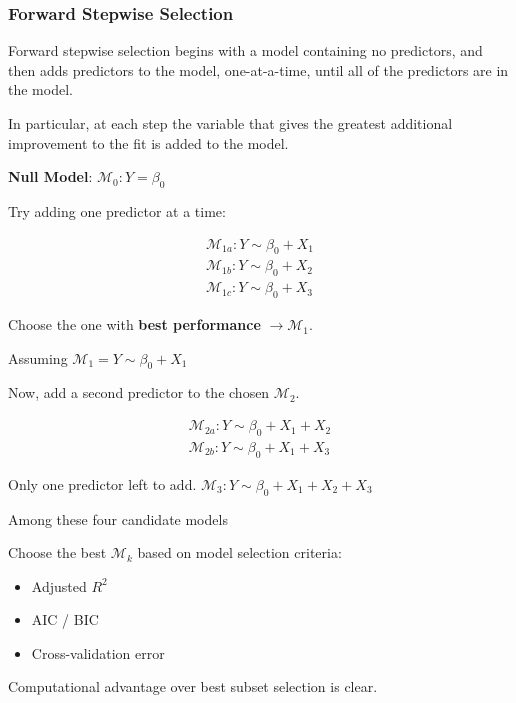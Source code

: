 \subsubsection{Forward Stepwise Selection}

\indent 

Forward stepwise selection begins with a model containing no predictors, and then adds predictors to the model, one-at-a-time, until all of the predictors are in the model.

In particular, at each step the variable that gives the greatest additional improvement to the fit is added to the model.

\bigskip

\step \textbf{Null Model}: $\mathcal{M}_0 : Y = \beta_0$

\step Try adding one predictor at a time:

\begin{align*}
    \mathcal{M}_{1a}: Y \sim \beta_0 +X_1\\
    \mathcal{M}_{1b}: Y \sim \beta_0 +X_2\\
    \mathcal{M}_{1c}: Y \sim \beta_0 +X_3
\end{align*}

Choose the one with \textbf{best performance} $\xrightarrow{} \mathcal{M}_1$.

\step Assuming $\mathcal{M}_1 = Y\sim \beta_0 +X_1$

Now, add a second predictor to the chosen $\mathcal{M}_2$.

\begin{align*}
    \mathcal{M}_{2a}: Y\sim \beta_0 +X_1+X_2\\
    \mathcal{M}_{2b}: Y\sim \beta_0 + X_1+X_3
\end{align*}

\step Only one predictor left to add. $\mathcal{M}_3: Y\sim \beta_0 +X_1+X_2+X_3$

\bigskip

Among these four candidate models

Choose the best $\mathcal{M}_k$ based on model selection criteria:

\begin{itemize}
    \item Adjusted $R^2$
    \item AIC / BIC
    \item Cross-validation error
\end{itemize}

Computational advantage over best subset selection is clear.

